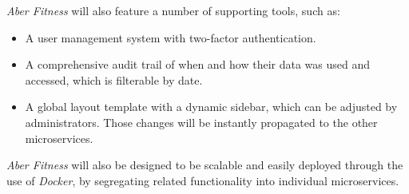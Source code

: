 \par
\textit{Aber Fitness} will also feature a number of supporting tools, such as:

\begin{itemize}
	\item A user management system with two-factor authentication.
	\item A comprehensive audit trail of when and how their data was used and accessed, which is filterable by date.
	\item A global layout template with a dynamic sidebar, which can be adjusted by administrators. Those changes will be instantly propagated to the other microservices.
\end{itemize}

\par
\textit{Aber Fitness} will also be designed to be scalable and easily deployed through the use of \textit{Docker}, by segregating related functionality into individual microservices.
